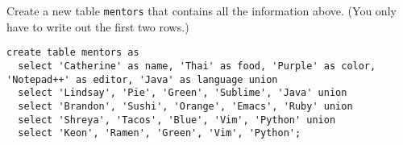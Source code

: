 \question Create a new table \lstinline$mentors$ that contains all the information above.
(You only have to write out the first two rows.)

\begin{solution}[1in]
\begin{lstlisting}
create table mentors as
  select 'Catherine' as name, 'Thai' as food, 'Purple' as color, 'Notepad++' as editor, 'Java' as language union
  select 'Lindsay', 'Pie', 'Green', 'Sublime', 'Java' union
  select 'Brandon', 'Sushi', 'Orange', 'Emacs', 'Ruby' union
  select 'Shreya', 'Tacos', 'Blue', 'Vim', 'Python' union
  select 'Keon', 'Ramen', 'Green', 'Vim', 'Python';
\end{lstlisting}
\end{solution}
